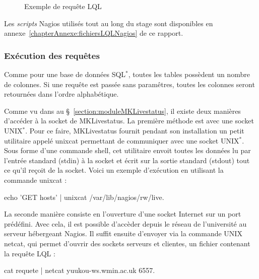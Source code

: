 \vspace{0.20cm}

\begin{figure}[!ht]
	
	\caption{Exemple de requ\^ete LQL}
	\label{code:exempleLQL}

\end{figure}

Les \textit{scripts} Nagios utilis\'es tout au long du stage sont disponibles en annexe~\ref{chapterAnnexe:fichiersLQLNagios} de ce rapport.

\subsubsection{Ex\'ecution des requ\^etes}

Comme pour une base de donn\'ees SQL$^*$, toutes les tables poss\`edent un nombre de colonnes.
Si une requ\^ete est pass\'ee sans param\^etres, toutes les colonnes seront retourn\'ees dans l'ordre alphab\'etique.

Comme vu dans au \S~\ref{section:moduleMKLivestatus}, il existe deux mani\`eres d'acc\'eder \`a la socket de MKLivestatus.
La premi\`ere m\'ethode est avec une socket UNIX$^*$. 
Pour ce faire, MKLivestatus fournit pendant son installation un petit utilitaire appel\'e \textsf{unixcat} permettant de communiquer avec une socket UNIX$^*$.
Sous forme d'une commande shell, cet utilitaire envoit toutes les donn\'ees lu par l'entr\'ee standard (stdin) \`a la socket et \'ecrit sur la sortie standard (stdout) tout ce qu'il re\c{c}oit de la socket.
Voici un exemple d'ex\'ecution en utilisant la commande \textsf{unixcat} : 

\begin{center}
	\textsf{echo 'GET hosts' | unixcat /var/lib/nagios/rw/live}.

\end{center}

La seconde mani\`ere consiste en l'ouverture d'une socket Internet sur un port pr\'ed\'efini.
Avec cela, il est possible d'acc\`eder depuis le r\'eseau de l'universit\'e au serveur h\'ebergeant Nagios.
Il suffit ensuite d'envoyer via la commande UNIX \textsf{netcat}, qui permet d'ouvrir des sockets serveurs et clientes, un fichier contenant la requ\^ete LQL :

\begin{center}
	\textsf{cat requete | netcat yuukou-ws.wmin.ac.uk 6557}.

\end{center}

